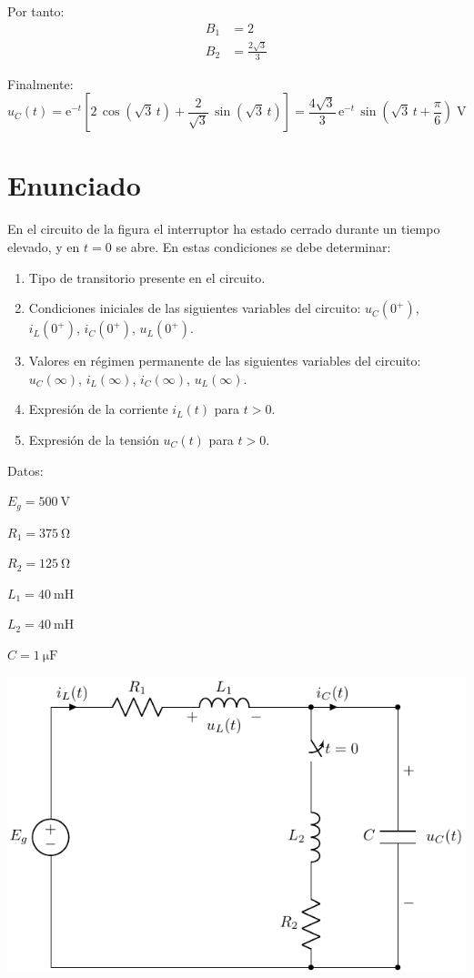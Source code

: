 Por tanto:
\begin{align*}
  B_1 &= 2\\
  B_2 &= \frac{2\sqrt{3}}{3}
\end{align*}

Finalmente:
\begin{equation*}
u_C(t)= \mathrm{e}^{-t}\left[2\,\cos(\sqrt{3}\,t)+\dfrac{2}{\sqrt{3}}\,\sin(\sqrt{3}\,t)\right]=\dfrac{4\sqrt{3}}{3}\,\mathrm{e}^{-t}\,\sin\left(\sqrt{3}\,t+\dfrac{\pi}{6}\right) \;\si{\volt}
\end{equation*}


\section{Enunciado}
En el circuito de la figura el interruptor ha estado cerrado durante un tiempo elevado, y en $t = 0$ se abre. En estas condiciones se debe determinar:

\begin{enumerate}
\item Tipo de transitorio presente en el circuito.

\item Condiciones iniciales de las siguientes variables del circuito: $u_C(0^+)$, $i_L(0^+)$, $i_C(0^+)$, $u_L(0^+)$.
\item Valores en régimen permanente de las siguientes variables del circuito: $u_C(\infty)$, $i_L(\infty)$, $i_C(\infty)$, $u_L(\infty)$.
\item Expresión de la corriente $i_L(t)$ para  $t > 0$.
\item Expresión de la tensión $u_C(t)$ para  $t > 0$.
\end{enumerate}

\begin{minipage}{0.3\linewidth}
  Datos:

  $E_g = \SI{500}{\volt}$

  $R_{1}= \SI{375}{\ohm}$%

  $R_{2}=\SI{125}{\ohm}$%

  $L_1 = \SI{40}{\milli\henry}$%

  $L_2 = \SI{40}{\milli\henry}$%

  $C = \SI{1}{\micro\farad}$%
\end{minipage}
\begin{minipage}{0.7\linewidth}
  \includegraphics{figuras/E1_RLC.pdf}
\end{minipage}

